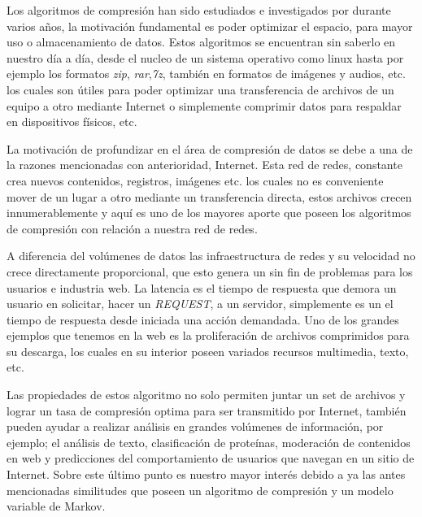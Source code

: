 




Los algoritmos de compresión han sido estudiados e investigados por durante varios años, la motivación fundamental es poder optimizar el espacio, para mayor uso o almacenamiento de datos. Estos algoritmos se encuentran sin saberlo en nuestro día a día, desde el nucleo de un sistema operativo como linux hasta por ejemplo los formatos \emph{zip}, \emph{rar},\emph{7z}, también en formatos de imágenes y audios, etc. los cuales son útiles para poder optimizar una transferencia de archivos de un equipo a otro mediante Internet o simplemente comprimir datos para respaldar en dispositivos físicos, etc.

La motivación de profundizar en el área de compresión de datos se debe a una de la razones mencionadas con anterioridad, Internet. Esta red de redes, constante crea nuevos contenidos, registros, imágenes etc. los cuales no es conveniente mover de un lugar a otro mediante un transferencia directa, estos archivos crecen innumerablemente y aquí es uno de los mayores aporte que poseen los algoritmos de compresión con relación a nuestra red de redes. 

A diferencia del volúmenes de datos las infraestructura de redes y su velocidad no crece directamente proporcional, que esto genera un sin fin de problemas para los usuarios e industria web. La latencia  es el tiempo de respuesta que demora un usuario en solicitar, hacer un \emph{REQUEST}, a un servidor, simplemente es un el tiempo de respuesta desde iniciada una acción demandada. 
Uno de los grandes ejemplos que tenemos en la web es la proliferación de archivos comprimidos para su descarga, los cuales en su interior poseen variados recursos multimedia, texto, etc.

Las propiedades de estos algoritmo no solo permiten juntar un set de archivos y lograr un tasa de compresión optima para ser transmitido por Internet, también pueden ayudar a realizar análisis en grandes volúmenes de información, por ejemplo; el análisis de texto, clasificación de proteínas, moderación de contenidos en web y predicciones del comportamiento de usuarios que navegan en un sitio de Internet. Sobre este último punto es nuestro mayor interés debido a ya las antes mencionadas similitudes que poseen un algoritmo de compresión y un modelo variable de Markov.

